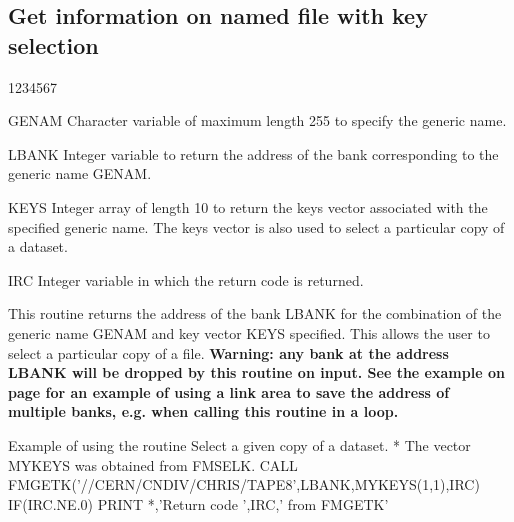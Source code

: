 \subsection{Get information on named file with key selection}
\begin{DLtt}{1234567}
\item[GENAM]
Character variable of maximum length 255 to specify the generic name.
\item[LBANK]
Integer variable to return the address of the bank corresponding
to the generic name GENAM.
\item[KEYS]
Integer array of length 10 to return the keys vector associated
with the specified generic name. The keys vector is also used
to select a particular copy of a dataset.
\item[IRC]
Integer variable in which the return code is returned.
\end{DLtt}
\par
This routine returns the address of the bank LBANK for the
combination of the generic name GENAM
and key vector KEYS specified. This allows the user
to select a particular copy of a file.
{\bf Warning: any bank at the address LBANK will be dropped by this
routine on input.
See the example on page
\pageref{LAREA} for an example of using a link area
to save the address of multiple banks, e.g. when calling this
routine in a loop.}
\begin{XMPt}{Example of using the \protect{} routine}
      Select a given copy of a dataset.
*     The vector MYKEYS was obtained from FMSELK.
      CALL FMGETK('//CERN/CNDIV/CHRIS/TAPE8',LBANK,MYKEYS(1,1),IRC)
      IF(IRC.NE.0) PRINT *,'Return code ',IRC,' from FMGETK'
\end{XMPt}
 
